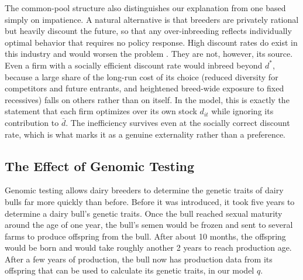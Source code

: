 \documentclass[12pt,letterpaper]{article}
\begin{document}
The common-pool structure also distinguishes our explanation from one based simply on impatience. A natural alternative is that breeders are privately rational but heavily discount the future, so that any over-inbreeding reflects individually optimal behavior that requires no policy response. High discount rates do exist in this industry and would worsen the problem \citep{Wuepper2023}. They are not, however, its source. Even a firm with a socially efficient discount rate would inbreed beyond $d^{*}$, because a large share of the long-run cost of its choice (reduced diversity for competitors and future entrants, and heightened breed-wide exposure to fixed recessives) falls on others rather than on itself. In the model, this is exactly the statement that each firm optimizes over its own stock $d_{it}$ while ignoring its contribution to $\bar{d}$. The inefficiency survives even at the socially correct discount rate, which is what marks it as a genuine externality rather than a preference.

\subsection{The Effect of Genomic Testing\label{subsec:effects_gt}}
Genomic testing allows dairy breeders to determine the genetic traits of dairy bulls far more quickly than before. Before it was introduced, it took five years to determine a dairy bull's genetic traits. Once the bull reached sexual maturity around the age of one year, the bull's semen would be frozen and sent to several farms to produce offspring from the bull. After about 10 months, the offspring would be born and would take roughly another 2 years to reach production age. 
After a few years of production, the bull now has production data from its offspring that can be used to calculate its genetic traits, in our model $q$.
\end{document}
